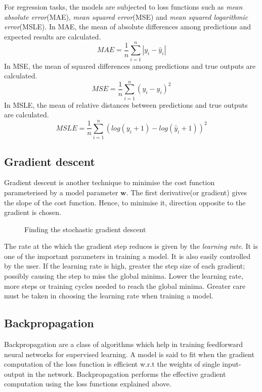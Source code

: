 For regression tasks, the models are subjected to loss functions such as \textit{mean
absolute error}(MAE), \textit{mean squared error}(MSE) and \textit{mean squared
logarithmic error}(MSLE). In MAE, the mean of absolute differences among predictions and
expected results are calculated.
\begin{equation}
    MAE = \frac{1}{n}\sum_{i=1}^n\left |y_i -\hat y_i \right|
   \label{eq:MAE}
\end{equation}
In MSE, the mean of squared differences among predictions and true outputs are
calculated.
\begin{equation}
    MSE = \frac{1}{n}\sum_{i=1}^n (y_i - \hat y_i)^2
    \label{eq:MSE}
\end{equation}
In MSLE, the mean of relative distances between predictions and true outputs are
calculated.
\begin{equation}
    MSLE = \frac{1}{n}\sum_{i=1}^n(log(y_i+1)-log(\hat y_i+1))^2
    \label{eq:MSLE}
\end{equation}

\subsection{Gradient descent}
\label{subsec:gradientdescent}
Gradient descent is another technique to minimise the cost function parameterised by a
model parameter $\mathbf{w}$. The first derivative(or gradient) gives the slope of the
cost function. Hence, to minimise it, direction opposite to the gradient is chosen.

\begin{figure}[h]
	\centering
    \def\svgwidth{0.5\textwidth}
        
    \caption{Finding the stochastic gradient descent}
    \label{fig:gradientdescent}
\end{figure}

The rate at the which the gradient step reduces is given by the \textit{learning rate}. It
is one of the important parameters in training a model. It is also easily controlled by
the user. If the learning rate is high, greater the step size of each gradient; possibly causing the
step to miss the global minima. Lower the learning rate, more steps or training cycles
needed to reach the global minima. Greater care must be taken in choosing the learning
rate when training a model.

\subsection{Backpropagation}
\label{subsec:backpropagation}
Backpropagation are a class of algorithms which help in training feedforward neural
networks for supervised learning. A model is said to fit when the gradient computation of
the loss function is efficient w.r.t the weights of single input-output in the network.
Backpropagation performs the effective gradient computation using the loss functions
explained above.

